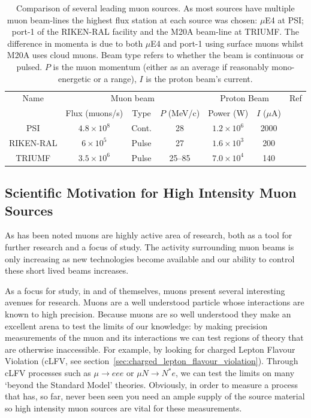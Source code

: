 \begin{table}[htpb]
  \begin{center}
  \begin{tabular}{c | c | c | c | c | c | c}
    Name       &  \multicolumn{3}{c|}{Muon beam}                  &  \multicolumn{2}{c|}{Proton Beam}  &   Ref        \\
               &  Flux (muons/s)     &  Type   & \( P \) (MeV/c)  &  Power (W)    & \(I\) (\(\mu\)A)   &              \\
    \hline    
    PSI        &  \(4.8\times10^8\)  &  Cont.  &  28              &  \(1.2\times10^6\)  &  2000  &  \cite{mue4_psi}    \\ 
    RIKEN-RAL  &  \(6\times10^5\)    &  Pulse  &  27              &  \(1.6\times10^3\)  &  200   &  \cite{riken_ral}   \\
    TRIUMF     &  \(3.5\times10^6\)  &  Pulse  &  25--85          &  \(7.0\times10^4\)  &  140   &  \cite{triumf_m20a} \\
  \end{tabular}
  \end{center}
  \caption{Comparison of several leading muon sources. As most sources have multiple muon beam-lines the highest flux station at each source was chosen: \(\mu\)E4 at PSI; port-1 of the RIKEN-RAL facility and the M20A beam-line at TRIUMF. The difference in momenta is due to both \(\mu\)E4 and port-1 using surface muons whilst M20A uses cloud muons. Beam type refers to whether the beam is continuous or pulsed. \( P \) is the muon momentum (either as an average if reasonably mono-energetic or a range), \( I \) is the proton beam's current.}
  \label{tab:cf_muon_sources}
\end{table}


\subsection{Scientific Motivation for High Intensity Muon Sources} %
\label{sec:scientific_motivation_for_high_intenstity_muon_sources}
As has been noted muons are highly active area of research, both as a tool for further research and a focus of study. The activity surrounding muon beams is only increasing as new technologies become available and our ability to control these short lived beams increases. 

As a focus for study, in and of themselves, muons present several interesting avenues for research. Muons are a well understood particle whose interactions are known to high precision. Because muons are so well understood they make an excellent arena to test the limits of our knowledge: by making precision measurements of the muon and its interactions we can test regions of theory that are otherwise inaccessible. For example, by looking for charged Lepton Flavour Violation (cLFV, see section~\ref{sec:charged_lepton_flavour_violation}). Through cLFV processes such as \( \mu\rightarrow eee \) or \( \mu N \rightarrow N^* e \), we can test the limits on many `beyond the Standard Model' theories. Obviously, in order to measure a process that has, so far, never been seen you need an ample supply of the source material so high intensity muon sources are vital for these measurements.

